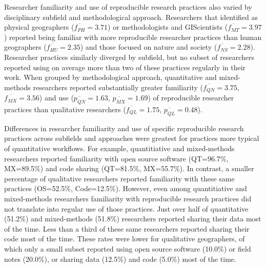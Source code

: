 \documentclass[]{interact}
\theoremstyle{plain}%
\theoremstyle{definition}
\theoremstyle{remark}
\begin{document}
Researcher familiarity and use of reproducible research practices also varied by disciplinary subfield and methodological approach. 
Researchers that identified as physical geographers ($\overline{f_{PH}}=3.71$) or methodologists and GIScientists ($\overline{f_{MT}}=3.97$) reported being familiar with more reproducible researcher practices than human  geographers ($\overline{f_{HU}}=2.35$) and those focused on nature and society ($\overline{f_{NS}}=2.28$).
Researcher practices similarly diverged by subfield, but no subset of researchers reported using on average more than two of these practices regularly in their work.  
When grouped by methodological approach, quantitative and mixed-methods researchers reported substantially greater familiarity ($\overline{f_{QN}}=3.75$, $\overline{f_{MX}}=3.56$) and use ($\overline{p_{QN}}=1.63$, $\overline{p_{MX}}=1.69$) of reproducible researcher practices than qualitative researchers ($\overline{f_{QL}}=1.75$, $\overline{p_{QL}}=0.48$).

Differences in researcher familiarity and use of specific reproducible research practices across subfields and approaches were greatest for practices more typical of quantitative workflows. 
For example, quantitiative and mixed-methods researchers reported familiarity with open source software (QT=96.7\%, MX=89.5\%) and code sharing (QT=81.5\%, MX=55.7\%).
In contrast, a smaller percentage of qualitative researchers reported familiarity with these same practices (OS=52.5\%, Code=12.5\%).
However, even among quantitiative and mixed-methods researchers familiarity with reproducible research practices did not translate into regular use of those practices.
Just over half of quantitative (51.2\%) and mixed-methods (51.8\%) researchers reported sharing their data most of the time.
Less than a third of these same researchers reported sharing their code most of the time. 
These rates were lower for qualitative geographers, of which only a small subset reported using open source software (10.0\%) or field notes (20.0\%), or sharing data (12.5\%) and code (5.0\%) most of the time.
\end{document}
